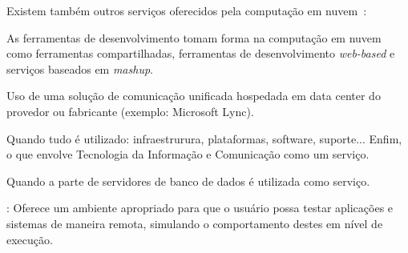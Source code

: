 Existem também outros serviços oferecidos pela computação em 
nuvem~\cite{informatica}:

\begin{itemise}

     As ferramentas de desenvolvimento 
    tomam forma na computação em nuvem como ferramentas compartilhadas, ferramentas 
    de desenvolvimento \emph{web-based} e serviços baseados em \emph{mashup}. 

     Uso de uma solução de comunicação 
    unificada hospedada em data center do provedor ou fabricante (exemplo: Microsoft 
    Lync). 

     Quando tudo é utilizado: infraestrurura, 
    plataformas, software, suporte... Enfim, o que envolve Tecnologia da Informação 
    e Comunicação como um serviço. 

     Quando a parte de servidores de banco de 
    dados é utilizada como serviço.

    : Oferece um ambiente apropriado para que o 
    usuário possa testar aplicações e sistemas de maneira remota, simulando o 
    comportamento destes em nível de execução.

\end{itemise}

\undef\itemm

